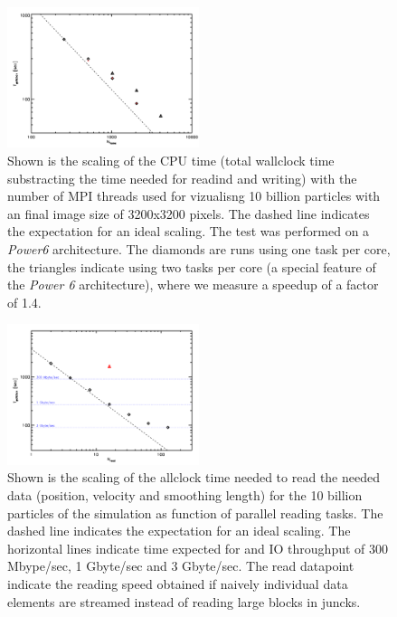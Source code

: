 \begin{figure}
\begin{center}
\includegraphics[width=0.5\textwidth]{t_cpu.pdf}
\end{center}
\caption{Shown is the scaling of the CPU time (total wallclock time substracting the time needed for 
readind and writing) with the number of MPI threads used for vizualisng 10 billion particles with an final
image size of 3200x3200 pixels. The dashed line indicates the expectation for an ideal scaling. The test was 
performed on a {\it Power6} architecture. The diamonds are runs using one task per core, the triangles indicate
using two tasks per core (a special feature of the {\it Power 6} architecture), where we measure a speedup of 
a factor of 1.4.}\label{cpu_scaling}
\end{figure}

\begin{figure}
\begin{center}
\includegraphics[width=0.5\textwidth]{t_read.pdf}
\end{center}
\caption{Shown is the scaling of the allclock time needed to read the needed data 
(position, velocity and smoothing length) for the 10 billion particles of the simulation
as function of parallel reading tasks. The dashed line indicates the expectation for an 
ideal scaling. The horizontal lines indicate time expected for and IO throughput of 300 Mbype/sec,
1 Gbyte/sec and 3 Gbyte/sec. The read datapoint indicate the reading speed obtained if naively 
individual data elements are streamed instead of reading large blocks in juncks.}\label{read_scaling}
\end{figure}

